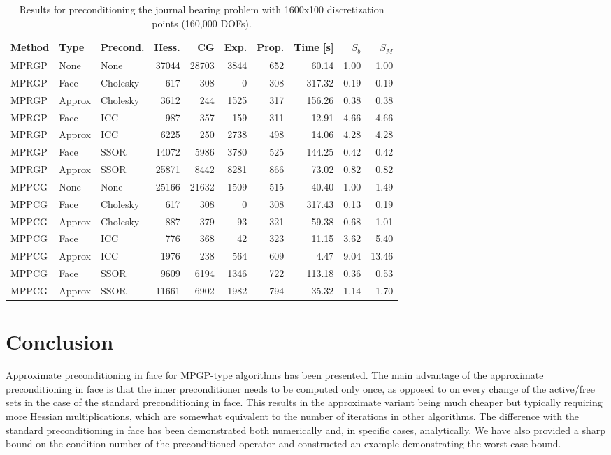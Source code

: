 \documentclass[11pt]{article}
\theoremstyle{plain}
\theoremstyle{definition}
\begin{document}
\begin{table}[htbp]
\centering
\begin{tabular}{l *{2}{|l} *{7}{|r}}
  Method & Type & Precond. & Hess. & CG & Exp. & Prop. & Time [s] & $S_b$ & $S_M$\\\hline
MPRGP & None & None & 37044 & 28703 & 3844 & 652 & 60.14 & 1.00 & 1.00\\ \hline
MPRGP & Face & Cholesky & 617 & 308 & 0 & 308 & 317.32 & 0.19 & 0.19\\
MPRGP & Approx & Cholesky & 3612 & 244 & 1525 & 317 & 156.26 & 0.38 & 0.38\\ \hline
MPRGP & Face & ICC & 987 & 357 & 159 & 311 & 12.91 & 4.66 & 4.66\\
MPRGP & Approx & ICC & 6225 & 250 & 2738 & 498 & 14.06 & 4.28 & 4.28\\ \hline
MPRGP & Face & SSOR & 14072 & 5986 & 3780 & 525 & 144.25 & 0.42 & 0.42\\
MPRGP & Approx & SSOR & 25871 & 8442 & 8281 & 866 & 73.02 & 0.82 & 0.82\\ \hline \hline
MPPCG & None & None & 25166 & 21632 & 1509 & 515 & 40.40 & 1.00 & 1.49\\ \hline
MPPCG & Face & Cholesky & 617 & 308 & 0 & 308 & 317.43 & 0.13 & 0.19\\
MPPCG & Approx & Cholesky & 887 & 379 & 93 & 321 & 59.38 & 0.68 & 1.01\\ \hline
MPPCG & Face & ICC & 776 & 368 & 42 & 323 & 11.15 & 3.62 & 5.40\\
MPPCG & Approx & ICC & 1976 & 238 & 564 & 609 & 4.47 & 9.04 & 13.46\\ \hline
MPPCG & Face & SSOR & 9609 & 6194 & 1346 & 722 & 113.18 & 0.36 & 0.53\\
MPPCG & Approx & SSOR & 11661 & 6902 & 1982 & 794 & 35.32 & 1.14 & 1.70\\
\end{tabular}
\caption[Preconditioned journal bearing problem IV.]{Results for preconditioning the journal bearing problem with 1600x100 discretization points (160,000 DOFs).}
\label{tab:precondJb4}
\end{table}

\section{Conclusion}
Approximate preconditioning in face for MPGP-type algorithms has been presented.
The main advantage of the approximate preconditioning in face is that the inner preconditioner needs to be computed only once, as opposed to on every change of the active/free sets in the case of the standard preconditioning in face.
This results in the approximate variant being much cheaper but typically requiring more Hessian multiplications, which are somewhat equivalent to the number of iterations in other algorithms.
The difference with the standard preconditioning in face has been demonstrated both numerically and, in specific cases, analytically.
We have also provided a sharp bound on the condition number of the preconditioned operator and constructed an example demonstrating the worst case bound.
\end{document}
